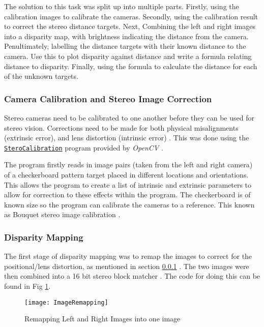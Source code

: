 \documentclass[conference]{IEEEtran}
\begin{document}
The solution to this task was split up into multiple parts. Firstly, using the calibration images to calibrate the cameras. Secondly, using the calibration result to correct the stereo distance targets. Next, Combining the left and right images into a disparity map, with brightness indicating the distance from the camera. Penultimately, labelling the distance targets with their known distance to the camera. Use this to plot disparity against distance and write a formula relating distance to disparity. Finally, using the formula to calculate the distance for each of the unknown targets.

\subsubsection{Camera Calibration and Stereo Image Correction} \label{Camera_Calibration}

Stereo cameras need to be calibrated to one another before they can be used for stereo vision. Corrections need to be made for both physical misalignments (extrinsic error), and lens distortion (intrinsic error) \cite{Stero_Calibration}. This was done using the \href{https://docs.opencv.org/2.4/modules/calib3d/doc/camera_calibration_and_3d_reconstruction.html?highlight=stereocalibration}{\texttt{SteroCalibration}} program provided by \textit{OpenCV} \cite{Book_Calibration}.

The program firstly reads in image pairs (taken from the left and right camera) of a checkerboard pattern target placed in different locations and orientations. This allows the program to create a list of intrinsic and extrinsic parameters to allow for correction to these effects within the program. The checkerboard is of known size so the program can calibrate the cameras to a reference. This known as Bouquet stereo image calibration \cite{Bouget}.

\subsubsection{Disparity Mapping} \label{Disparity_Mapping}

The first stage of disparity mapping was to remap the images to correct for the positional/lens distortion, as mentioned in section \ref{Camera_Calibration} \cite{OpenCV_Remapping}. The two images were then combined into a 16 bit stereo block matcher \cite{Stereo_Block_Matching}. The code for doing this can be found in Fig \ref{fig:ImageRemapping}.

\begin{figure}[H]
\centerline{\texttt{[image: ImageRemapping]}}
\caption{Remapping Left and Right Images into one image}
\label{fig:ImageRemapping}
\end{figure}
\end{document}
